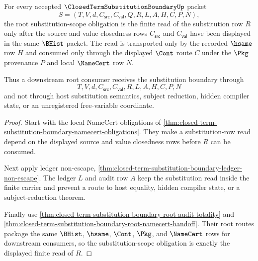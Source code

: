 \begin{theorem}
\label{thm:closed-term-substitution-boundary-root-substitution-scope}
For every accepted $\ClosedTermSubstitutionBoundaryUp$ packet
$$
S=(T,V,d,C_{\mathsf{src}},C_{\mathsf{val}},Q,R,L,A,H,C,P,N),
$$
the root substitution-scope obligation is the finite read of the substitution row $R$ only after the source and value closedness rows $C_{\mathsf{src}}$ and $C_{\mathsf{val}}$ have been displayed in the same $\BHist$ packet. The read is transported only by the recorded $\hsame$ row $H$ and consumed only through the displayed $\Cont$ route $C$ under the $\Pkg$ provenance $P$ and local $\NameCert$ row $N$.

Thus a downstream root consumer receives the substitution boundary through
$$
T,V,d,C_{\mathsf{src}},C_{\mathsf{val}},R,L,A,H,C,P,N
$$
and not through host substitution semantics, subject reduction, hidden compiler state, or an unregistered free-variable coordinate.
\end{theorem}
\begin{proof}
Start with the local NameCert obligations of \autoref{thm:closed-term-substitution-boundary-namecert-obligations}. They make a substitution-row read depend on the displayed source and value closedness rows before $R$ can be consumed.

Next apply ledger non-escape, \autoref{thm:closed-term-substitution-boundary-ledger-non-escape}. The ledger $L$ and audit row $A$ keep the substitution read inside the finite carrier and prevent a route to host equality, hidden compiler state, or a subject-reduction theorem.

Finally use \autoref{thm:closed-term-substitution-boundary-root-audit-totality} and \autoref{thm:closed-term-substitution-boundary-root-namecert-handoff}. Their root routes package the same $\BHist$, $\hsame$, $\Cont$, $\Pkg$, and $\NameCert$ rows for downstream consumers, so the substitution-scope obligation is exactly the displayed finite read of $R$.
\end{proof}

